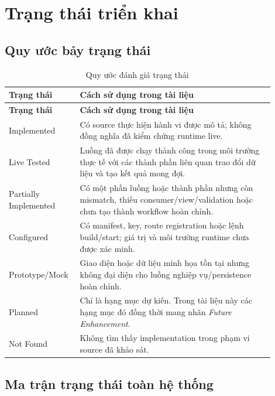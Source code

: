 \chapter{Trạng thái triển khai}
\label{chap:implementation-status}

\section{Quy ước bảy trạng thái}

\begin{longtable}{p{0.21\linewidth}p{0.69\linewidth}}
\caption{Quy ước đánh giá trạng thái}\label{tab:implementation-status-definitions}\\
\hline
\textbf{Trạng thái} & \textbf{Cách sử dụng trong tài liệu} \\
\hline
\endfirsthead
\hline
\textbf{Trạng thái} & \textbf{Cách sử dụng trong tài liệu} \\
\hline
\endhead
Implemented & Có source thực hiện hành vi được mô tả; không đồng nghĩa đã kiểm chứng runtime live. \\
Live Tested & Luồng đã được chạy thành công trong môi trường thực tế với các thành phần liên quan trao đổi dữ liệu và tạo kết quả mong đợi. \\
Partially Implemented & Có một phần luồng hoặc thành phần nhưng còn mismatch, thiếu consumer/view/validation hoặc chưa tạo thành workflow hoàn chỉnh. \\
Configured & Có manifest, key, route registration hoặc lệnh build/start; giá trị và môi trường runtime chưa được xác minh. \\
Prototype/Mock & Giao diện hoặc dữ liệu minh họa tồn tại nhưng không đại diện cho luồng nghiệp vụ/persistence hoàn chỉnh. \\
Planned & Chỉ là hạng mục dự kiến. Trong tài liệu này các hạng mục đó đồng thời mang nhãn \textit{Future Enhancement}. \\
Not Found & Không tìm thấy implementation trong phạm vi source đã khảo sát. \\
\hline
\end{longtable}

\section{Ma trận trạng thái toàn hệ thống}

